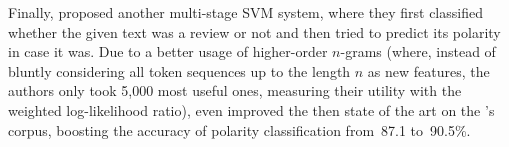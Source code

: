 Finally, \citet{Ng:06} proposed another multi-stage SVM system, where
they first classified whether the given text was a review or not and
then tried to predict its polarity in case it was.  Due to a better
usage of higher-order $n$-grams (where, instead of bluntly considering
all token sequences up to the length $n$ as new features, the authors
only took 5,000 most useful ones, measuring their utility with the
weighted log-likelihood ratio), \citet{Ng:06} even improved the then
state of the art on the \citeauthor{Pang:04}'s corpus, boosting the
accuracy of polarity classification from~87.1 to~90.5\%.




